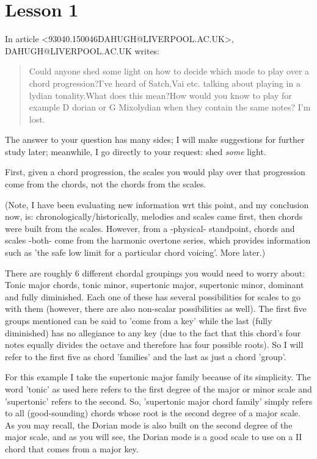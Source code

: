 \section{Lesson 1}
In article \textless93040.150046DAHUGH@LIVERPOOL.AC.UK\textgreater, DAHUGH@LIVERPOOL.AC.UK writes:
\begin{quote}
  Could anyone shed some light on how to decide which mode to play over a chord progression?I've heard of Satch,Vai etc. talking about playing in a lydian tonality.What does this mean?How would you know to play for example D dorian or G Mixolydian when they contain the same notes? I'm lost.
\end{quote}

The answer to your question has many sides; I will make suggestions for 
further study later; meanwhile, I go directly to your request: shed \emph{some} 
light.

First, given a chord progression, the scales you would play over that
progression come from the chords, not the chords from the scales.

(Note, I have been evaluating new information wrt this point, and my
conclusion now, is: chronologically/historically, melodies and scales
came first, then chords were built from the scales. However, from a
-physical- standpoint, chords and scales -both- come from the harmonic
overtone series, which provides information such as 'the safe low limit
for a particular chord voicing'. More later.)

There are roughly 6 different chordal groupings you would need to worry about:
Tonic major chords, tonic minor, supertonic major, supertonic minor, dominant
and fully diminished. Each one of these has several possibilities for scales
to go with them (however, there are also non-scalar possibilities as well).
The first five groups mentioned can be said to 'come from a key' while the last
(fully diminished) has no allegiance to any key (due to the fact that this
chord's four notes equally divides the octave and therefore has four possible
roots). So I will refer to the first five as chord 'families' and the last
as just a chord 'group'.

For this example I take the supertonic major family because of its simplicity.
The word 'tonic' as used here refers to the first degree of the major or minor
scale and 'supertonic' refers to the second. So, 'supertonic major chord family'
simply refers to all (good-sounding) chords whose root is the second degree of
a major scale. As you may recall, the Dorian mode is also built on the second
degree of the major scale, and as you will see, the Dorian mode is a good
scale to use on a II chord that comes from a major key.

